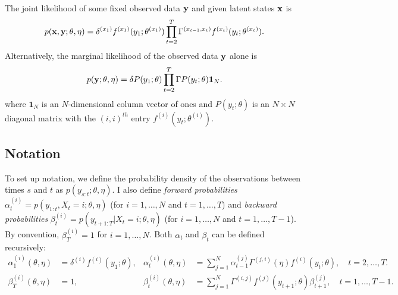 The joint likelihood of some fixed observed data $\mathbf{y}$ and given latent states $\mathbf{x}$ is
%
\begin{equation}
    p(\mathbf{x},\mathbf{y};\theta,\eta) = \delta^{(x_1)} f^{(x_1)}(y_1; \theta^{(x_1)}) \prod_{t=2}^T \Gamma^{(x_{t-1},x_t)} f^{(x_t)}(y_t; \theta^{(x_t)}).
    \label{eqn:like}
\end{equation}
%
Alternatively, the marginal likelihood of the observed data $\mathbf{y}$ alone is 
%
\begin{equation}
    p(\mathbf{y};\theta,\eta) = \delta P(y_1;\theta) \prod_{t=2}^T \Gamma P(y_t;\theta) \mathbf{1}_N.
    \label{eqn:like_marginal}
\end{equation}
%
where $\mathbf{1}_N$ is an $N$-dimensional column vector of ones and $P(y_t;\theta)$ is an $N \times N$ diagonal matrix with the $(i,i)^{th}$ entry $f^{(i)}(y_t; \theta^{(i)})$.

\subsection{Notation}

To set up notation, we define the probability density of the observations between times $s$ and $t$ as $p(y_{s:t};\theta,\eta)$. I also define \textit{forward probabilities} $\alpha^{(i)}_t = p(y_{1:t},X_t = i;\theta,\eta)$ (for $i = 1,\ldots,N$ and $t = 1,\ldots,T$) and \textit{backward probabilities} $\beta^{(i)}_t = p(y_{t+1:T}|X_t = i;\theta,\eta)$ (for $i = 1,\ldots,N$ and $t = 1,\ldots,T-1$). By convention, $\beta^{(i)}_T = 1$ for $i = 1,\ldots,N$. 
Both $\alpha_t$ and $\beta_t$ can be defined recursively:
%
\begin{align*}
    \alpha_1^{(i)}(\theta,\eta) &= \delta^{(i)} f^{(i)}(y_1;\theta), & \alpha_t^{(i)}(\theta,\eta) &= \sum_{j=1}^N \alpha_{t-1}^{(j)} \Gamma^{(j,i)}(\eta) f^{(i)}(y_t;\theta), \quad t = 2,\ldots,T.\\
    \beta_T^{(i)}(\theta,\eta) &= 1, & \beta_t^{(i)}(\theta,\eta) &= \sum_{j=1}^N \Gamma^{(i,j)} f^{(j)}(y_{t+1};\theta) \beta^{(j)}_{t+1}, \quad t = 1,\ldots,T-1.
\end{align*}

